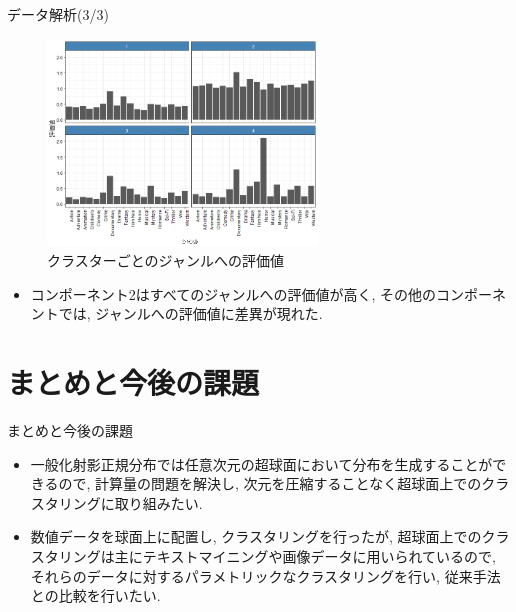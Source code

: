 \documentclass[dvipdfmx]{beamer} %
\begin{document}
\begin{frame}{データ解析(3/3)}
\begin{figure}[tbp]
\begin{center}
\includegraphics[clip,height= 55mm]{data/cluster_plot.png}
\end{center}
\caption{クラスターごとのジャンルへの評価値}
\label{clustergenre}
\end{figure}

\begin{itemize}
	\item コンポーネント2はすべてのジャンルへの評価値が高く, その他のコンポーネントでは, ジャンルへの評価値に差異が現れた.
\end{itemize}
\end{frame}

\section{まとめと今後の課題}
\begin{frame}{まとめと今後の課題}

\begin{itemize}

\item
一般化射影正規分布では任意次元の超球面において分布を生成することができるので, 計算量の問題を解決し, 次元を圧縮することなく超球面上でのクラスタリングに取り組みたい. 

\vspace{0.2cm}
\item
数値データを球面上に配置し, クラスタリングを行ったが, 超球面上でのクラスタリングは主にテキストマイニングや画像データに用いられているので, それらのデータに対するパラメトリックなクラスタリングを行い, 従来手法との比較を行いたい. 

\end{itemize}

\end{frame}
\end{document}
